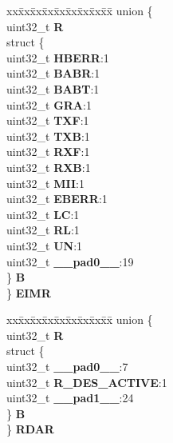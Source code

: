 \begin{DoxyCompactItemize}
\begin{tabbing}
\end{tabbing}\item 
\mbox{\label{structFEC__tag_ae378a77c253c52a2f385f58af7f47660}} 
\begin{tabbing}
xx\=xx\=xx\=xx\=xx\=xx\=xx\=xx\=xx\=\kill
union \{\\
\>uint32\_t {\bfseries R}\\
\>struct \{\\
\>\>uint32\_t {\bfseries HBERR}:1\\
\>\>uint32\_t {\bfseries BABR}:1\\
\>\>uint32\_t {\bfseries BABT}:1\\
\>\>uint32\_t {\bfseries GRA}:1\\
\>\>uint32\_t {\bfseries TXF}:1\\
\>\>uint32\_t {\bfseries TXB}:1\\
\>\>uint32\_t {\bfseries RXF}:1\\
\>\>uint32\_t {\bfseries RXB}:1\\
\>\>uint32\_t {\bfseries MII}:1\\
\>\>uint32\_t {\bfseries EBERR}:1\\
\>\>uint32\_t {\bfseries LC}:1\\
\>\>uint32\_t {\bfseries RL}:1\\
\>\>uint32\_t {\bfseries UN}:1\\
\>\>uint32\_t {\bfseries \_\_pad0\_\_}:19\\
\>\} {\bfseries B}\\
\} {\bfseries EIMR}\\

\end{tabbing}\item 
\mbox{\label{structFEC__tag_a743b86d4f2a465be5a3c257c4a1cc574}} 
\begin{tabbing}
xx\=xx\=xx\=xx\=xx\=xx\=xx\=xx\=xx\=\kill
union \{\\
\>uint32\_t {\bfseries R}\\
\>struct \{\\
\>\>uint32\_t {\bfseries \_\_pad0\_\_}:7\\
\>\>uint32\_t {\bfseries R\_DES\_ACTIVE}:1\\
\>\>uint32\_t {\bfseries \_\_pad1\_\_}:24\\
\>\} {\bfseries B}\\
\} {\bfseries RDAR}\\


\end{tabbing}
\end{DoxyCompactItemize}
